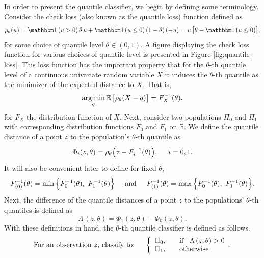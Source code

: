In order to present the quantile classifier, we begin by defining some
terminology.  Consider the check loss (also known as the quantile loss) function
defined as
\begin{align}
  \label{eq:check-loss}
  \rho_\theta(u)
  = \ind(u > 0)\, \theta\, u  + \ind (u \leq 0)\, (1 - \theta)\, (-u)
  = u\, \big[ \theta - \ind(u \leq 0) \big],
\end{align}
for some choice of quantile level $\theta \in (0,1)$.  A figure displaying the
check loss function for various choices of quantile level is presented in Figure
\ref{fig:quantile-loss}.  This loss function has the important property that for
the $\theta$-th quantile level of a continuous univariate random variable $X$ it
induces the $\theta$-th quantile as the minimizer of the expected distance to
$X$.  That is,
\begin{equation}
  \label{eq:check-loss-min}
  \operatorname*{arg\,min}_q \mathbb{E}\, \big[ \rho_\theta (X - q) \big] = F_X^{-1}(\theta),
\end{equation}
for $F_X$ the distribution function of $X$.  Next, consider two populations
$\Pi_0$ and $\Pi_1$ with corresponding distribution functions $F_0$ and $F_1$ on
$\mathbb{R}$.  We define the quantile distance of a point $z$ to the
population's $\theta$-th quantile as
\begin{equation}
  \label{eq:phi}
  \Phi_i(z, \theta) = \rho_{\theta}\Big(z - F_i^{-1}(\theta)\Big),
  \hspace{5mm} i = 0, 1.
\end{equation}
It will also be convenient later to define for fixed $\theta$,
\begin{equation}
  \label{eq:F-order-stats}
  F_{(0)}^{-1}(\theta) = \min\Big\{ F_0^{-1}(\theta),~ F_1^{-1}(\theta) \Big\}
  \hspace{5mm} \text{and} \hspace{5mm}
  F_{(1)}^{-1}(\theta) = \max\Big\{ F_0^{-1}(\theta),~ F_1^{-1}(\theta) \Big\}.
\end{equation}
Next, the difference of the quantile distances of a point $z$ to the populations'
$\theta$-th quantiles is defined as
\begin{equation}
  \Lambda\,(z, \theta) = \Phi_1(z, \theta) - \Phi_0(z, \theta).
\end{equation}
With these definitions in hand, the $\theta$-th quantile classifier is
defined as follows.
\begin{equation}
  \label{eq:quantile-classifier}
  \text{For an observation $z$, classify to:} \hspace{5mm} \left\{ 
    \begin{array}{lcl}
      \Pi_0, & & \text{if} \hspace{3mm}\Lambda\,(z, \theta) > 0 \\[0ex]
      \Pi_1, & & \text{otherwise}
    \end{array} .
  \right.
\end{equation}
